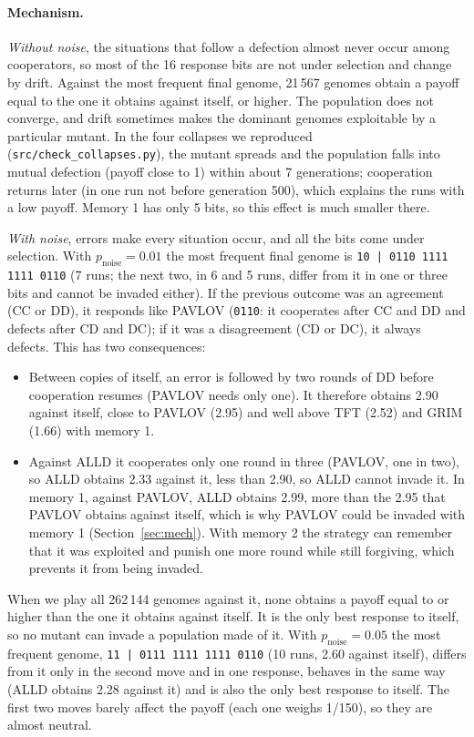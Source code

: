 \documentclass[10pt,a4paper]{article}
\newcommand{\pn}{p_{\text{noise}}}
\newcommand{\g}[1]{\texttt{#1}}   %
\begin{document}
\paragraph{Mechanism.} \emph{Without noise}, the situations that follow a defection almost never occur
among cooperators, so most of the 16 response bits are not under selection and change by drift. Against the
most frequent final genome, 21\,567 genomes obtain a payoff equal to the one it obtains against
itself, or higher. The population does not converge, and drift
sometimes makes the dominant genomes exploitable by a particular mutant. In the four collapses we
reproduced (\texttt{src/check\_collapses.py}), the mutant spreads and the population falls into mutual defection (payoff close to 1) within
about 7 generations; cooperation returns later (in one run not before generation 500), which explains the
runs with a low payoff. Memory 1 has only 5 bits, so this effect is much smaller there.

\emph{With noise}, errors make every situation occur, and all the bits come under selection. With
$\pn=0.01$ the most frequent final genome is \g{10\,|\,0110\,1111\,1111\,0110} (7 runs; the next two, in 6 and 5
runs, differ from it in one or three bits and cannot be invaded either). If the previous outcome was an agreement (CC or DD), it responds like
PAVLOV (\g{0110}: it cooperates after CC and DD and defects after CD and DC); if it was a disagreement (CD
or DC), it always defects. This has two consequences:
\begin{itemize}
  \item Between copies of itself, an error is followed by two rounds of DD before cooperation resumes
        (PAVLOV needs only one). It therefore obtains 2.90 against itself, close to PAVLOV (2.95) and well
        above TFT (2.52) and GRIM (1.66) with memory 1.
  \item Against ALLD it cooperates only one round in three (PAVLOV, one in two), so ALLD obtains 2.33
        against it, less than 2.90, so ALLD cannot invade it. In memory 1, against PAVLOV, ALLD obtains 2.99,
        more than the 2.95 that PAVLOV obtains against itself, which is why PAVLOV
        could be invaded with memory 1 (Section~\ref{sec:mech}). With memory 2 the strategy can remember
        that it was exploited and punish one more round while still forgiving, which prevents it from being invaded.
\end{itemize}
When we play all 262\,144 genomes against it, none obtains a payoff equal to or higher than the one it
obtains against itself. It is the only best response to itself, so no mutant can invade a population made of
it. With $\pn=0.05$ the most frequent genome, \g{11\,|\,0111\,1111\,1111\,0110} (10 runs, 2.60 against
itself), differs from it only in the second move and in one response, behaves in the same way (ALLD obtains
2.28 against it) and is also the only best response to itself. The
first two moves barely affect the payoff (each one weighs 1/150), so they are almost neutral.
\end{document}
